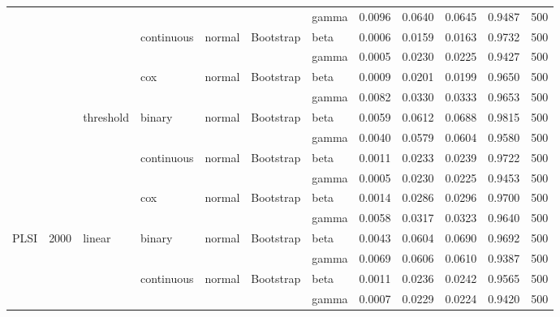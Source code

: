 \begin{tabular}{lllllllrrrrr}
 &  &  &  &  &  & gamma & 0.0096 & 0.0640 & 0.0645 & 0.9487 & 500 \\
\cline{4-12} \cline{5-12} \cline{6-12}
 &  &  & \multirow[t]{2}{*}{continuous} & \multirow[t]{2}{*}{normal} & \multirow[t]{2}{*}{Bootstrap} & beta & 0.0006 & 0.0159 & 0.0163 & 0.9732 & 500 \\
 &  &  &  &  &  & gamma & 0.0005 & 0.0230 & 0.0225 & 0.9427 & 500 \\
\cline{4-12} \cline{5-12} \cline{6-12}
 &  &  & \multirow[t]{2}{*}{cox} & \multirow[t]{2}{*}{normal} & \multirow[t]{2}{*}{Bootstrap} & beta & 0.0009 & 0.0201 & 0.0199 & 0.9650 & 500 \\
 &  &  &  &  &  & gamma & 0.0082 & 0.0330 & 0.0333 & 0.9653 & 500 \\
\cline{3-12} \cline{4-12} \cline{5-12} \cline{6-12}
 &  & \multirow[t]{6}{*}{threshold} & \multirow[t]{2}{*}{binary} & \multirow[t]{2}{*}{normal} & \multirow[t]{2}{*}{Bootstrap} & beta & 0.0059 & 0.0612 & 0.0688 & 0.9815 & 500 \\
 &  &  &  &  &  & gamma & 0.0040 & 0.0579 & 0.0604 & 0.9580 & 500 \\
\cline{4-12} \cline{5-12} \cline{6-12}
 &  &  & \multirow[t]{2}{*}{continuous} & \multirow[t]{2}{*}{normal} & \multirow[t]{2}{*}{Bootstrap} & beta & 0.0011 & 0.0233 & 0.0239 & 0.9722 & 500 \\
 &  &  &  &  &  & gamma & 0.0005 & 0.0230 & 0.0225 & 0.9453 & 500 \\
\cline{4-12} \cline{5-12} \cline{6-12}
 &  &  & \multirow[t]{2}{*}{cox} & \multirow[t]{2}{*}{normal} & \multirow[t]{2}{*}{Bootstrap} & beta & 0.0014 & 0.0286 & 0.0296 & 0.9700 & 500 \\
 &  &  &  &  &  & gamma & 0.0058 & 0.0317 & 0.0323 & 0.9640 & 500 \\
\cline{1-12} \cline{2-12} \cline{3-12} \cline{4-12} \cline{5-12} \cline{6-12}
\multirow[t]{18}{*}{PLSI} & \multirow[t]{18}{*}{2000} & \multirow[t]{6}{*}{linear} & \multirow[t]{2}{*}{binary} & \multirow[t]{2}{*}{normal} & \multirow[t]{2}{*}{Bootstrap} & beta & 0.0043 & 0.0604 & 0.0690 & 0.9692 & 500 \\
 &  &  &  &  &  & gamma & 0.0069 & 0.0606 & 0.0610 & 0.9387 & 500 \\
\cline{4-12} \cline{5-12} \cline{6-12}
 &  &  & \multirow[t]{2}{*}{continuous} & \multirow[t]{2}{*}{normal} & \multirow[t]{2}{*}{Bootstrap} & beta & 0.0011 & 0.0236 & 0.0242 & 0.9565 & 500 \\
 &  &  &  &  &  & gamma & 0.0007 & 0.0229 & 0.0224 & 0.9420 & 500 \\

\end{tabular}
